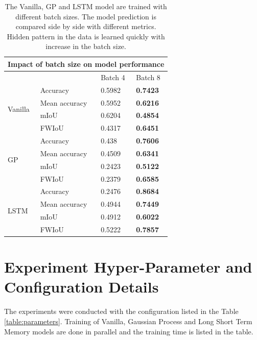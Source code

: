 	
	\begin{table}
		\centering
		\begin{tabular}{|l|l|l|l|} 
			\hline
			\multicolumn{4}{|l|}{\textbf{Impact of batch size on model performance} }      \\ 
			\hline
			&               & Batch 4 & Batch 8          \\ 
			\hline
			\multirow{4}{*}{Vanilla} & Accuracy      & 0.5982  & \textbf{0.7423}  \\ 
			\cline{2-4}
			& Mean accuracy & 0.5952  & \textbf{0.6216}  \\ 
			\cline{2-4}
			& mIoU          & 0.6204  & \textbf{0.4854}  \\ 
			\cline{2-4}
			& FWIoU         & 0.4317  & \textbf{0.6451}  \\ 
			\hline
			\multirow{4}{*}{GP}      & Accuracy      & 0.438   & \textbf{0.7606}  \\ 
			\cline{2-4}
			& Mean accuracy & 0.4509  & \textbf{0.6341}  \\ 
			\cline{2-4}
			& mIoU          & 0.2423  & \textbf{0.5122}  \\ 
			\cline{2-4}
			& FWIoU         & 0.2379  & \textbf{0.6585}  \\ 
			\hline
			\multirow{4}{*}{LSTM}    & Accuracy      & 0.2476  & \textbf{0.8684}  \\ 
			\cline{2-4}
			& Mean accuracy & 0.4944  & \textbf{0.7449}  \\ 
			\cline{2-4}
			& mIoU          & 0.4912  & \textbf{0.6022}  \\ 
			\cline{2-4}
			& FWIoU         & 0.5222  & \textbf{0.7857}  \\
			\hline
		\end{tabular}
		\caption{The Vanilla, GP and LSTM model are trained with different batch sizes. The model prediction is compared side by side with different metrics. Hidden pattern in the data is learned quickly with increase in the batch size.}
	\label{table:hype3}
	\end{table}

	\newpage
	\section{Experiment Hyper-Parameter and Configuration Details }
	
	The experiments were conducted with the configuration listed in the Table \ref{table:parameters}. Training of Vanilla, Gaussian Process and Long Short Term Memory models are done in parallel and the training time is listed in the table.
	
